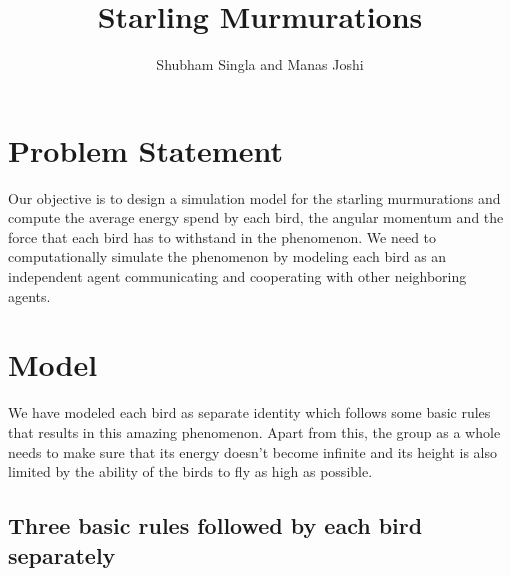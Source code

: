 \documentclass[a4paper]{article}
\title{Starling Murmurations}
\author{Shubham Singla and Manas Joshi}
\begin{document}
\maketitle

\section{Problem Statement}

Our objective is to design a simulation model for the starling murmurations and compute the average energy spend by each bird, the angular momentum and the force that each bird has to withstand in the phenomenon. We need to computationally simulate the phenomenon by modeling each bird as an independent agent communicating and cooperating with other neighboring agents.
\section{Model}

We have modeled each bird as separate identity which follows some basic rules that results in this amazing phenomenon. Apart from this, the group as a whole needs to make sure that its energy doesn't become infinite and its height is also limited by the ability of the birds to fly as high as possible. 

\subsection{Three basic rules followed by each bird separately }
\end{document}
